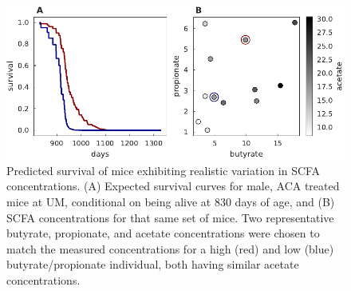 \documentclass{doc/template/bmcart-nofigbox}
\begin{document}
\begin{figure}[h!]
  \centering
  \includegraphics{fig/survival_predict.pdf}
  \caption{\label{fig:survival_predict}
  Predicted survival of mice exhibiting realistic variation in SCFA
  concentrations.
  (A) Expected survival curves for male, ACA treated mice at UM, conditional
  on being alive at 830 days of age, and (B) SCFA concentrations for that same
  set of mice.
  Two representative butyrate, propionate, and acetate concentrations were chosen
  to match the measured concentrations for a high (red) and low (blue)
  butyrate/propionate individual, both having similar acetate concentrations.
  }
\end{figure}

\FloatBarrier

\end{document}
